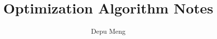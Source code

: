 \documentclass[times]{cls/mcp-acm}
\begin{document}
\frontmatter
\title{Optimization Algorithm Notes}
\author{Depu Meng}


\maketitle
\tableofcontents
%
\mainmatter






%
% 
\end{document}
